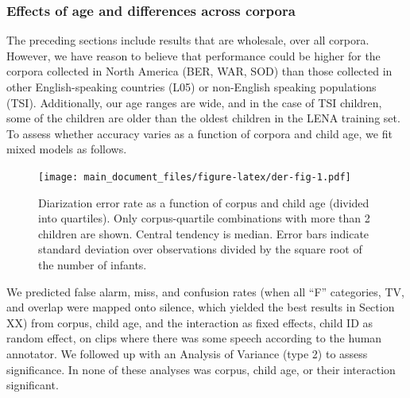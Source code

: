 \documentclass[english,floatsintext,man]{apa6}
\begin{document}
\subsubsection{Effects of age and differences across
corpora}\label{effects-of-age-and-differences-across-corpora}

The preceding sections include results that are wholesale, over all
corpora. However, we have reason to believe that performance could be
higher for the corpora collected in North America (BER, WAR, SOD) than
those collected in other English-speaking countries (L05) or non-English
speaking populations (TSI). Additionally, our age ranges are wide, and
in the case of TSI children, some of the children are older than the
oldest children in the LENA training set. To assess whether accuracy
varies as a function of corpora and child age, we fit mixed models as
follows.

\begin{figure}
\centering
\texttt{[image: main\_document\_files/figure-latex/der-fig-1.pdf]}
\caption{\label{fig:der-fig}Diarization error rate as a function of corpus
and child age (divided into quartiles). Only corpus-quartile
combinations with more than 2 children are shown. Central tendency is
median. Error bars indicate standard deviation over observations divided
by the square root of the number of infants.}
\end{figure}

We predicted false alarm, miss, and confusion rates (when all
\enquote{F} categories, TV, and overlap were mapped onto silence, which
yielded the best results in Section XX) from corpus, child age, and the
interaction as fixed effects, child ID as random effect, on clips where
there was some speech according to the human annotator. We followed up
with an Analysis of Variance (type 2) to assess significance. In none of
these analyses was corpus, child age, or their interaction significant.
\end{document}
